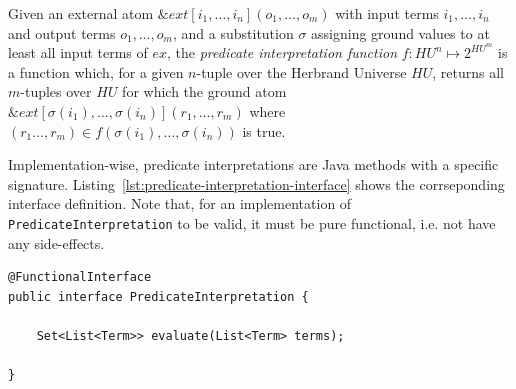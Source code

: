 \begin{definition}
\label{def:external-atom-interpretation}    
 Given an external atom $\&\mathit{ext}[i_1,\ldots,i_n](o_1,\ldots,o_m)$ with input terms $i_1,\ldots,i_n$ and output terms $o_1,\ldots,o_m$, and a substitution $\sigma$ assigning ground values to at least all input terms of $ex$, the \emph{predicate interpretation function} $f: HU^n \mapsto 2^{HU^m}$ is a function which, for a given $n$-tuple over the Herbrand Universe $HU$, returns all $m$-tuples over $HU$ for which the ground atom $\&\mathit{ext}[\sigma(i_1),\ldots,\sigma(i_n)](r_1,\ldots,r_m)$ where $(r_1\ldots,r_m) \in f(\sigma(i_1),\ldots,\sigma(i_n))$ is true.
\end{definition}

Implementation-wise, predicate interpretations are Java methods with a specific signature. Listing~\ref{lst:predicate-interpretation-interface} shows the corrseponding interface definition. Note that, for an implementation of \texttt{PredicateInterpretation} to be valid, it must be pure functional, i.e. not have any side-effects.
\begin{lstlisting}[style=java, label={lst:predicate-interpretation-interface}, caption={Java Interface for Predicate Interpretations}]
@FunctionalInterface
public interface PredicateInterpretation {
    
    Set<List<Term>> evaluate(List<Term> terms);

}    
\end{lstlisting}

